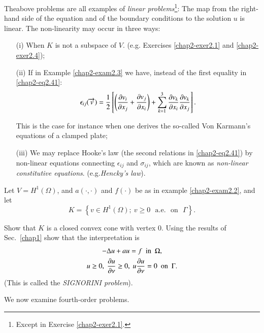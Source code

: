 \begin{remark}\label{chap2-rem2.3}
The\pageoriginale above problems are all examples of {\em linear
  problems}\footnote[2]{Except in Exercise \ref{chap2-exer2.1}.}:
The map from the right-hand side of the equation and of the boundary
conditions to the solution $u$ is linear. The non-linearity may occur
in three ways:
\begin{itemize}
\item[(i)] When $K$ is not a subspace of $V$. (e.g. Exercises
  \ref{chap2-exer2.1} and \ref{chap2-exer2.4}); 

\item[(ii)] If in Example \ref{chap2-exam2.3} we have, instead of the
  first equality in \eqref{chap2-eq2.41}:
$$
\epsilon_{ij}(\overrightarrow{v})=\frac{1}{2}\left[\left(\frac{\partial v_{i}}{\partial
    x_{j}}+\frac{\partial v_{j}}{\partial x_{i}}\right)+\sum^{3}_{k=1}\frac{\partial
    v_{k}}{\partial x_{i}}\frac{\partial v_{k}}{\partial x_{j}}\right].  
$$

This is the case for instance when one derives the so-called Von
Karmann's equations of a clamped plate;

\item[(iii)] We may replace Hooke's law (the second relations in
  \eqref{chap2-eq2.41}) by non-linear equations connecting
  $\epsilon_{ij}$ and $\sigma_{ij}$, which are known as {\em
    non-linear constitutive equations}. (e.g.\@ {\em Hencky's law}). 
\end{itemize}
\end{remark}

\begin{exercise}\label{chap2-exer2.4}
Let $V=H^{1}(\Omega)$, and $a(\cdot,\cdot)$ and $f(\cdot)$ be as in
example \ref{chap2-exam2.2}, and let
{\fontsize{10}{12}\selectfont
$$
K=\left\{v\in H^{1}(\Omega);\ v\geq 0\text{~ a.e.~ on~ }
\Gamma\right\}.
$$}

Show that $K$ is a closed convex cone with vertex $0$. Using the
results of Sec.~\ref{chap1} show that the interpretation is
\begin{gather*}
-\Delta u+au=f\text{~ in~ }\Omega,\\
u\geq 0,\ \frac{\partial u}{\partial \nu}\geq 0,\ u\frac{\partial u}{\partial \nu}=0\text{~
  on~ } \Gamma.
\end{gather*}
(This is called the {\em SIGNORINI problem}).
\end{exercise}

We now examine fourth-order problems.

